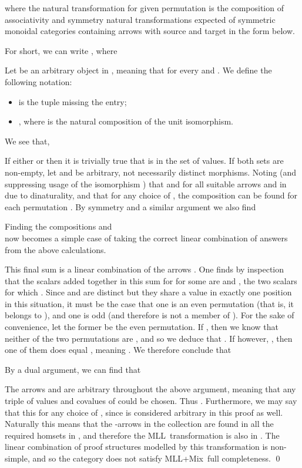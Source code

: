 \documentclass{LMCS}
\theoremstyle{plain}\newtheorem*{cLm}{Claim}
\newcommand{\mll}{MLL} \newcommand{\mall}{MALL}
\newcommand{\mllmix}{MLL+Mix} \newcommand{\GRel}{\mathbf{GRel}}
\newcommand{\p}{} \newcommand{\N}{\mathbb{N}}
\begin{document}
    where the natural transformation  for given permutation  is the composition of associativity and symmetry natural transformations expected of symmetric monoidal categories containing arrows with source and target in the form below.
    
    For short, we can write , where
    
    
    Let  be an arbitrary object in , meaning that  for every  and . We define the following notation:
    \begin{itemize}
    \item  is the tuple  missing the  entry;
    \item , where  is the natural composition of the unit isomorphism.
    \end{itemize}
    
\noindent    We see that,
    
    
    \p\noindent If either  or  then it is trivially true that  is in the set of values. If both sets are non-empty, let  and  be arbitrary, not necessarily distinct morphisms. Noting (and suppressing usage of the isomorphism ) that  and  for all suitable arrows  and  in  due to dinaturality, and that  for any choice of , the composition  can be found for each permutation . 
    By symmetry and a similar argument we also find
    
    
    
    




\noindent    Finding the compositions  and \\  now becomes a simple case of taking the correct linear combination of answers from the above calculations.

    This final sum is a linear combination of the arrows . One finds by inspection that the scalars added together in this sum for  for some  are  and , the two scalars for which . Since  and  are distinct but they share a value in exactly one position in this situation, it must be the case that one is an even permutation (that is, it belongs to ), and one is odd (and therefore is not a member of ). For the sake of convenience, let the former be the even permutation. If , then we know that neither of the two permutations are , and so we deduce that \linebreak . If however, , then one of them does equal , meaning . We therefore conclude that
    
    By a dual argument, we can find that 
    
    
\noindent    The arrows  and  are arbitrary throughout the above argument, meaning that any triple of values and covalues of  could be chosen. Thus . Furthermore, we may say that this for any choice of , since  is considered arbitrary in this proof as well. Naturally this means that the -arrows in the collection  are found in all the required homsets in , and therefore the \mll~transformation  is also in . The linear combination of proof structures modelled by this transformation is non-simple, and so the category does not satisfy \mllmix~full completeness. \qed
    
\end{document}
